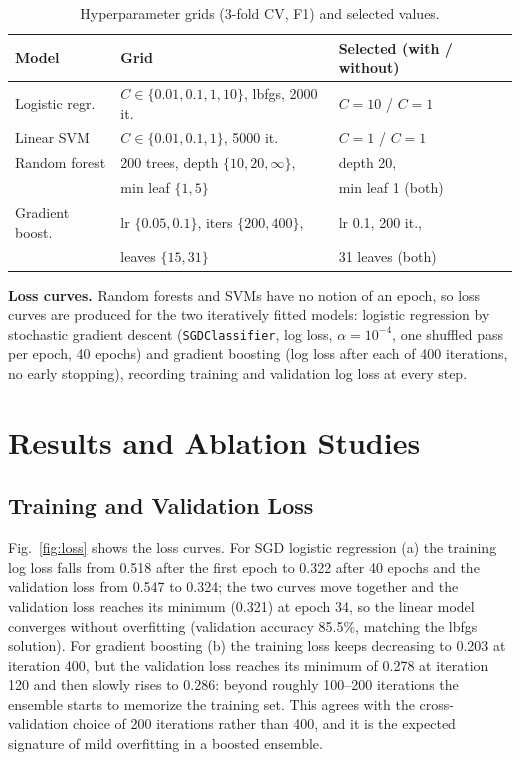 \documentclass[conference]{IEEEtran}
\begin{document}
\begin{table}[t]
\caption{Hyperparameter grids (3-fold CV, F1) and selected values.}
\label{tab:hyper}
\centering\scriptsize
\setlength{\tabcolsep}{3pt}
\begin{tabular}{lll}
\toprule
Model & Grid & Selected (with / without) \\
\midrule
Logistic regr. & $C\in\{0.01,0.1,1,10\}$, lbfgs, 2000 it. & $C{=}10$ / $C{=}1$ \\
Linear SVM & $C\in\{0.01,0.1,1\}$, 5000 it. & $C{=}1$ / $C{=}1$ \\
Random forest & 200 trees, depth $\{10,20,\infty\}$, & depth 20, \\
 & min leaf $\{1,5\}$ & min leaf 1 (both) \\
Gradient boost. & lr $\{0.05,0.1\}$, iters $\{200,400\}$, & lr 0.1, 200 it., \\
 & leaves $\{15,31\}$ & 31 leaves (both) \\
\bottomrule
\end{tabular}
\end{table}

\textbf{Loss curves.} Random forests and SVMs have no notion of an epoch, so loss curves are produced for the two iteratively fitted models: logistic regression by stochastic gradient descent (\texttt{SGDClassifier}, log loss, $\alpha=10^{-4}$, one shuffled pass per epoch, 40 epochs) and gradient boosting (log loss after each of 400 iterations, no early stopping), recording training and validation log loss at every step.

\section{Results and Ablation Studies}

\subsection{Training and Validation Loss}
Fig.~\ref{fig:loss} shows the loss curves. For SGD logistic regression (a) the training log loss falls from 0.518 after the first epoch to 0.322 after 40 epochs and the validation loss from 0.547 to 0.324; the two curves move together and the validation loss reaches its minimum (0.321) at epoch 34, so the linear model converges without overfitting (validation accuracy 85.5\%, matching the lbfgs solution). For gradient boosting (b) the training loss keeps decreasing to 0.203 at iteration 400, but the validation loss reaches its minimum of 0.278 at iteration 120 and then slowly rises to 0.286: beyond roughly 100--200 iterations the ensemble starts to memorize the training set. This agrees with the cross-validation choice of 200 iterations rather than 400, and it is the expected signature of mild overfitting in a boosted ensemble.
\end{document}
